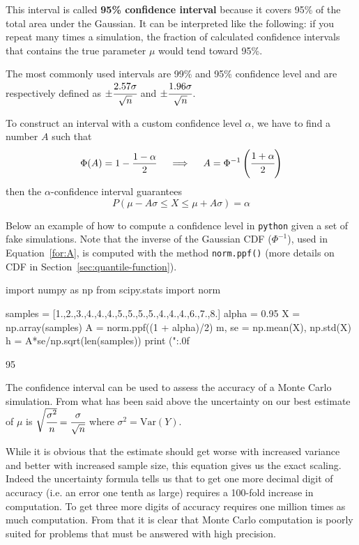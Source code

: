 This interval is called \textbf{95\% confidence interval} because it covers 95\% of the total area under the Gaussian. It can be interpreted like the following: if you repeat many times a simulation, the fraction of calculated confidence intervals that contains the true parameter $\mu$ would tend toward 95\%.

The most commonly used intervals are 99\% and 95\% confidence level and are respectively defined as \(\pm \cfrac{2.57\sigma}{\sqrt{n}}\) and \(\pm \cfrac{1.96\sigma}{\sqrt{n}}\).

To construct an interval with a custom confidence level $\alpha$, we have to find a number $A$ such that
\begin{equation}
\Phi(A) = 1 - \frac{1-\alpha}{2}\quad\implies\quad A = \Phi^{-1}\left(\cfrac{1+\alpha}{2}\right)
\label{for:A}
\end{equation}
then the $\alpha$-confidence interval guarantees
\begin{equation}
P(\mu - A\sigma \le X \le \mu+ A\sigma) = \alpha 
\end{equation}

Below an example of how to compute a confidence level in \texttt{python} given a set of fake simulations. Note that the inverse of the Gaussian CDF ($\Phi^{-1}$), used in Equation~\ref{for:A}, is computed with the method \texttt{norm.ppf()} (more details on CDF in Section~\ref{sec:quantile-function}).

\begin{ipython}
import numpy as np
from scipy.stats import norm

samples = [1.,2.,3.,4.,4.,4.,5.,5.,5.,5.,4.,4.,4.,6.,7.,8.]
alpha = 0.95
X = np.array(samples)
A = norm.ppf((1 + alpha)/2)
m, se = np.mean(X), np.std(X)
h = A*se/np.sqrt(len(samples))
print ("{:.0f}%
\end{ipython}
\begin{ioutput}
95%
\end{ioutput}

The confidence interval can be used to assess the accuracy of a Monte Carlo simulation. From what has been said above the uncertainty on our best estimate of $\mu$ is $\sqrt{\cfrac{\sigma^2}{n}}=\cfrac{\sigma}{\sqrt{n}}$ where \(\sigma^2 = \mathrm{Var}(Y)\).

While it is obvious that the estimate should get worse with increased variance and better with increased sample size, this equation  gives us the exact scaling. Indeed the uncertainty formula tells us that to get one more decimal digit of accuracy (i.e. an error one tenth as large) requires a 100-fold increase in computation. To get three more digits of accuracy requires one million times as much computation. From that it is clear that Monte Carlo computation is poorly suited for problems that must be answered with high precision.

